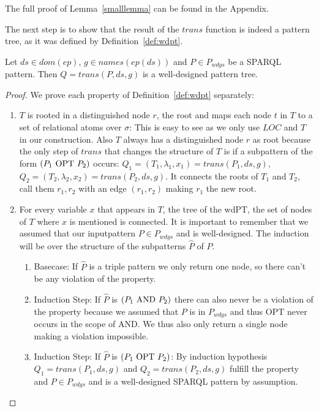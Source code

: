 The full proof of Lemma~\ref{smalllemma} can be found in the Appendix. 

The next step is to show that the result of the $trans$ function is indeed a pattern tree, as it was defined by Definition~\ref{def:wdpt}.

\begin{lemma}
	Let $ds \in dom(ep)$, $g \in names(ep(ds))$ and $P \in P_{wdgs}$ be a SPARQL pattern.
	Then $Q = trans(P,ds,g)$ is a well-designed pattern tree. 
\end{lemma}

\begin{proof}
	We prove each property of Definition~\ref{def:wdpt} separately:
	\begin{enumerate}
		\item $T$ is rooted in a distinguished node $r$, the root and maps
			each node $t$ in  $T$ to a set of relational atoms over $\sigma$:
			This is easy to see as we only use $LOC$ and $T$ in our
			construction. Also $T$ always has a distinguished node $r$ as root
			because the only step of $trans$ that changes the structure of $T$
			is if a subpattern of the form $(P_1 \mbox{ OPT } P_2)$ occurs: 
			$Q_1 = (T_1,\lambda_1,x_1)  = trans(P_1,ds,g)$,
			$Q_2 = (T_2,\lambda_2,x_2)  = trans(P_2,ds,g)$. 
			It connects the roots of $T_1$ and $T_2$, call them $r_1,r_2$ with
			an edge $(r_1,r_2)$ making $r_1$ the new root.  

		\item For every variable $x$ that appears
			in $T$, the tree of the wdPT, the set of nodes of $T$ where $x$ is mentioned is connected.
			It is important to remember that we assumed that our inputpattern $P
			\in P_{wdgs}$ and is well-designed.
			The induction will be over the structure of the subpatterns $\hat{P}$ of $P$.
			\begin{enumerate}
			
				\item Basecase: If $\hat{P}$ is a triple pattern we only return one node, so there can't be any
					violation of the property.

				\item Induction Step: If $\hat{P}$ is $(P_1 \mbox{ AND }  P_2)$ there can 
					also never be a violation of the
					property because we assumed that $P$ is in $P_{wdgs}$ and thus OPT never
					occurs in the scope of AND. We thus also only return a single node making a
					violation impossible.

				\item Induction Step: If $\hat{P}$ is $(P_1 \mbox{ OPT }  P_2)$:
					By induction hypothesis $Q_1 = trans(P_1,ds,g)$ and $Q_2 =
					trans(P_2,ds,g)$ fulfill the property and $P \in P_{wdgs}$ 
					and is a well-designed SPARQL pattern by assumption. 


\end{enumerate}
\end{enumerate}
\end{proof}
